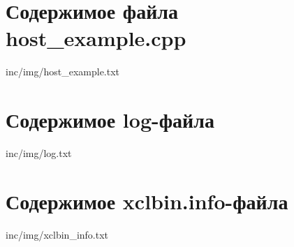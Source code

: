 \chapter{Содержимое файла host\_example.cpp}
\label{cha:appendix1}

\begin{lstinputlisting}[
	caption={Содержимое файла host\_example.cpp},
	label={hostexample.cpp},
	]{inc/img/host_example.txt}
\end{lstinputlisting}

\chapter{Содержимое log-файла}
\label{cha:appendix1}

\begin{lstinputlisting}[
	caption={Содержимое log-файла},
	label={log},
	]{inc/img/log.txt}
\end{lstinputlisting}

\chapter{Содержимое xclbin.info-файла}
\label{cha:appendix1}

\begin{lstinputlisting}[
	caption={Содержимое xclbin.info-файла},
	label={xclbin},
	]{inc/img/xclbin_info.txt}
\end{lstinputlisting}